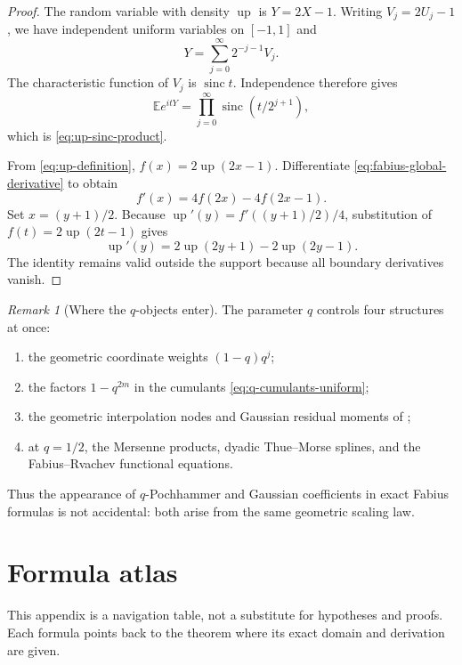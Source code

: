 \documentclass[11pt,oneside,openany]{book}
\theoremstyle{definition}
\theoremstyle{remark}
\newtheorem{remark}[theorem]{Remark}
\begin{document}
\begin{proof}
The random variable with density $\operatorname{up}$ is
$Y=2X-1$.  Writing $V_j=2U_j-1$, we have independent uniform variables on $[-1,1]$ and
\[
 Y=\sum_{j=0}^{\infty}2^{-j-1}V_j.
\]
The characteristic function of $V_j$ is $\operatorname{sinc}t$.  Independence therefore gives
\[
 \mathbb Ee^{itY}
 =\prod_{j=0}^{\infty}\operatorname{sinc}(t/2^{j+1}),
\]
which is \eqref{eq:up-sinc-product}.

From \eqref{eq:up-definition},
$f(x)=2\operatorname{up}(2x-1)$.  Differentiate
\eqref{eq:fabius-global-derivative} to obtain
\[
 f'(x)=4f(2x)-4f(2x-1).
\]
Set $x=(y+1)/2$.  Because
$\operatorname{up}'(y)=f'((y+1)/2)/4$, substitution of
$f(t)=2\operatorname{up}(2t-1)$ gives
\[
 \operatorname{up}'(y)
 =2\operatorname{up}(2y+1)-2\operatorname{up}(2y-1).
\]
The identity remains valid outside the support because all boundary derivatives vanish.
\end{proof}

\begin{remark}[Where the $q$-objects enter]
The parameter $q$ controls four structures at once:
\begin{enumerate}
\item the geometric coordinate weights $(1-q)q^j$;
\item the factors $1-q^{2m}$ in the cumulants \eqref{eq:q-cumulants-uniform};
\item the geometric interpolation nodes and Gaussian residual moments of ;
\item at $q=1/2$, the Mersenne products, dyadic Thue--Morse splines, and the Fabius--Rvachev functional equations.
\end{enumerate}
Thus the appearance of $q$-Pochhammer and Gaussian coefficients in exact Fabius formulas is not accidental: both arise from the same geometric scaling law.
\end{remark}


\appendix

\chapter{Formula atlas}\label{app:atlas}

This appendix is a navigation table, not a substitute for hypotheses and proofs.  Each formula points back to the theorem where its exact domain and derivation are given.

\end{document}

